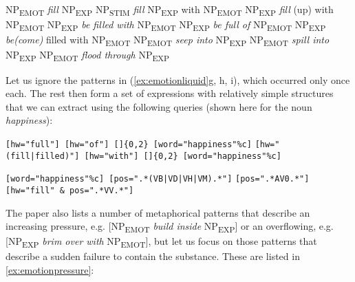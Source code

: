 \begin{exe}
\ex
\begin{xlist} 
\label{ex:emotionliquid}
\ex NP\textsubscript{EMOT} \textit{fill} NP\textsubscript{EXP}
\ex NP\textsubscript{STIM} \textit{fill} NP\textsubscript{EXP} with NP\textsubscript{EMOT}
\ex NP\textsubscript{EXP} \textit{fill} (up) with NP\textsubscript{EMOT}
\ex NP\textsubscript{EXP} \textit{be filled with} NP\textsubscript{EMOT}
\ex NP\textsubscript{EXP} \textit{be full of} NP\textsubscript{EMOT}
\ex NP\textsubscript{EXP} \textit{be(come)} filled with NP\textsubscript{EMOT}
\ex NP\textsubscript{EMOT} \textit{seep into} NP\textsubscript{EXP}
\ex NP\textsubscript{EMOT} \textit{spill into} NP\textsubscript{EXP}
\ex NP\textsubscript{EMOT} \textit{flood through} NP\textsubscript{EXP}
\end{xlist}
\end{exe}

Let us ignore the patterns in (\ref{ex:emotionliquid}g, h, i), which occurred only once each. The rest then form a set of expressions with relatively simple structures that we can extract using the following queries (shown here for the noun \textit{happiness}):

\begin{exe}
\ex 
\begin{xlist} 
\label{ex:emotionliquidquery}
\ex \texttt{[hw="full"] [hw="of"] []\{0,2\} [word="happiness"\%c]}
\ex \texttt{[hw="(fill|filled)"] [hw="with"] []\{0,2\} [word="happiness"\%c]}
\ex \begin{minipage}[t]{0.85\textwidth} \raggedright \texttt{[word="happiness"\%c] [pos=".*(VB|VD|VH|VM).*"]} \texttt{[pos=".*AV0.*"] [hw="fill" \& pos=".*VV.*"]} \end{minipage}
\end{xlist}
\end{exe}

The paper also lists a number of metaphorical patterns that describe an increasing pressure, e.g. [NP\textsubscript{EMOT} \textit{build inside} NP\textsubscript{EXP}] or an overflowing, e.g. [NP\textsubscript{EXP} \textit{brim over with} NP\textsubscript{EMOT}], but let us focus on those patterns that describe a sudden failure to contain the substance. These are listed in \ref{ex:emotionpressure}:

